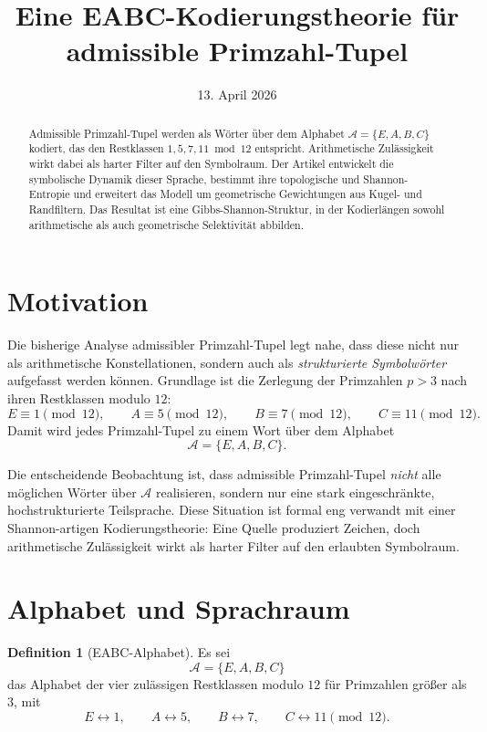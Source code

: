 \documentclass[11pt,a4paper]{article}
\title{Eine EABC-Kodierungstheorie für admissible Primzahl-Tupel}
\author{}
\date{13. April 2026}
\theoremstyle{definition}
\newtheorem{definition}{Definition}[section]
\begin{document}
	\maketitle
	
	\begin{abstract}
		Admissible Primzahl-Tupel werden als Wörter über dem Alphabet $\mathcal{A}=\{E,A,B,C\}$ kodiert, das den Restklassen $1,5,7,11 \bmod 12$ entspricht. Arithmetische Zulässigkeit wirkt dabei als harter Filter auf den Symbolraum. Der Artikel entwickelt die symbolische Dynamik dieser Sprache, bestimmt ihre topologische und Shannon-Entropie und erweitert das Modell um geometrische Gewichtungen aus Kugel- und Randfiltern. Das Resultat ist eine Gibbs-Shannon-Struktur, in der Kodierlängen sowohl arithmetische als auch geometrische Selektivität abbilden.
	\end{abstract}
	
	\section{Motivation}
	
	Die bisherige Analyse admissibler Primzahl-Tupel legt nahe, dass diese nicht nur als arithmetische Konstellationen, sondern auch als \emph{strukturierte Symbolwörter} aufgefasst werden können. Grundlage ist die Zerlegung der Primzahlen \(p>3\) nach ihren Restklassen modulo \(12\):
	\[
	E \equiv 1 \pmod{12},\qquad
	A \equiv 5 \pmod{12},\qquad
	B \equiv 7 \pmod{12},\qquad
	C \equiv 11 \pmod{12}.
	\]
	Damit wird jedes Primzahl-Tupel zu einem Wort über dem Alphabet
	\[
	\mathcal A=\{E,A,B,C\}.
	\]
	
	Die entscheidende Beobachtung ist, dass admissible Primzahl-Tupel \emph{nicht} alle möglichen Wörter über \(\mathcal A\) realisieren, sondern nur eine stark eingeschränkte, hochstrukturierte Teilsprache. Diese Situation ist formal eng verwandt mit einer Shannon-artigen Kodierungstheorie: Eine Quelle produziert Zeichen, doch arithmetische Zulässigkeit wirkt als harter Filter auf den erlaubten Symbolraum.
	
	\section{Alphabet und Sprachraum}
	
	\begin{definition}[EABC-Alphabet]
		Es sei
		\[
		\mathcal A=\{E,A,B,C\}
		\]
		das Alphabet der vier zulässigen Restklassen modulo \(12\) für Primzahlen größer als \(3\), mit
		\[
		E \leftrightarrow 1,\qquad
		A \leftrightarrow 5,\qquad
		B \leftrightarrow 7,\qquad
		C \leftrightarrow 11 \pmod{12}.
		\]
	\end{definition}
	
\end{document}
